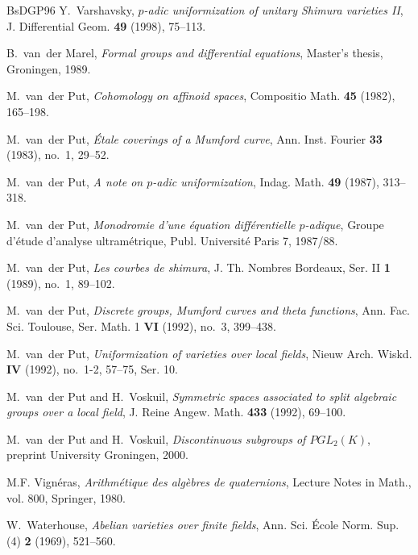 \begin{thebibliography}{BsDGP96}
Y.~Varshavsky, \emph{$p$-adic uniformization of unitary {S}himura varieties
  {I}{I}}, J. Differential Geom. \textbf{49} (1998), 75--113.

B.~van~der Marel, \emph{Formal groups and differential equations}, Master's
  thesis, Groningen, 1989.

M.~van~der Put, \emph{Cohomology on affinoid spaces}, Compositio Math.
  \textbf{45} (1982), 165--198.

M.~van~der Put, \emph{\'{E}tale coverings of a {M}umford curve}, Ann. Inst.
  Fourier \textbf{33} (1983), no.~1, 29--52.

M.~van~der Put, \emph{A note on $p$-adic uniformization}, Indag. Math.
  \textbf{49} (1987), 313--318.

M.~van~der Put, \emph{Monodromie d'une \'equation diff\'erentielle $p$-adique},
  Groupe d'\'etude d'analyse ultram\'etrique, Publ. Universit\'e Paris 7,
  1987/88.

M.~van~der Put, \emph{Les courbes de shimura}, J. Th. Nombres Bordeaux, Ser. II
  \textbf{1} (1989), no.~1, 89--102.

M.~van~der Put, \emph{Discrete groups, Mumford curves and theta functions},
  Ann. Fac. Sci. Toulouse, Ser. Math. 1 \textbf{VI} (1992), no.~3, 399--438.

M.~van~der Put, \emph{Uniformization of varieties over local fields}, Nieuw
  Arch. Wiskd. \textbf{IV} (1992), no.~1-2, 57--75, Ser. 10.

M.~van~der Put and H.~Voskuil, \emph{Symmetric spaces associated to split
  algebraic groups over a local field}, J. Reine Angew. Math. \textbf{433}
  (1992), 69--100.

M.~van~der Put and H.~Voskuil, \emph{Discontinuous subgroups of
  ${P}{G}{L}_2({K})$}, preprint University Groningen, 2000.

M.F. Vign\'eras, \emph{Arithm\'etique des alg\`ebres de quaternions}, Lecture
  Notes in Math., vol. 800, Springer, 1980.

W.~Waterhouse, \emph{Abelian varieties over finite fields}, Ann. Sci. {\'E}cole
  Norm. Sup. (4) \textbf{2} (1969), 521--560.


\end{thebibliography}

